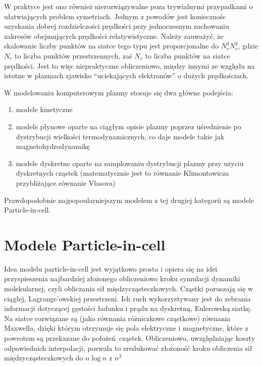     W praktyce jest ono również nierozwiązywalne poza trywialnymi przypadkami o ułatwiających problem symetriach.
    Jednym z powodów jest koniecznośc uzyskania dobrej rozdzielczości prędkości
    przy jednoczesnym zachowaniu zakresów obejmujących prędkości relatywistyczne. Należy zauważyć, że skalowanie
    liczby punktów na siatce tego typu jest proporcjonalne do $N_r^3 N_v^3$, gdzie $N_r$ to liczba punktów przestrzennych, zaś
    $N_v$ to liczba punktów na siatce prędkości. Jest to więc niepraktyczne
    obliczeniowo, 
    między innymi ze względu na istotne w plazmach zjawisko ``uciekających elektronów'' o dużych prędkościach.

    W modelowaniu komputerowym plazmy stosuje się dwa główne podejścia:
    \begin{enumerate}
        \item modele kinetyczne 
        \item modele płynowe oparte na ciągłym opisie plazmy poprzez uśrednienie po dystrybucji
            wielkości termodynamicznych, co daje modele takie jak magnetohydrodynamikę 
        \item modele dyskretne oparte na samplowaniu dystrybucji plazmy przy użyciu dyskretnych cząstek
            (matematycznie jest to równanie Klimontowicza przybliżające równanie Vlasova) 
    \end{enumerate}

    Prawdopodobnie najpopoularniejszym modelem z tej drugiej kategorii są modele Particle-in-cell.

    \section{Modele Particle-in-cell}

    Idea modelu particle-in-cell jest wyjątkowo prosta i opiera się na idei przyspieszenia najbardziej złożonego obliczeniowo kroku
    symulacji dynamiki molekularnej, czyli obliczania sił międzycząsteczkowych. Cząstki poruszają się w ciągłej, Lagrange'owskiej przestrzeni.
    Ich ruch wykorzystywany jest do zebrania informacji dotyczącej gęstości ładunku i prądu na dyskretną, Eulerowską siatkę. Na siatce rozwiązane
    są (jako równania różniczkowe cząstkowe) równania Maxwella, dzięki którym otrzymuje się pola elektryczne i magnetyczne, które z powrotem są przekazane
    do położeń cząstek. Obliczeniowo, uwzględniając koszty odpowiednich interpolacji, pozwala to zredukować złożoność kroku obliczenia sił międzycząsteczkowych
    do $n \log{n}$ z $n^2$ 

